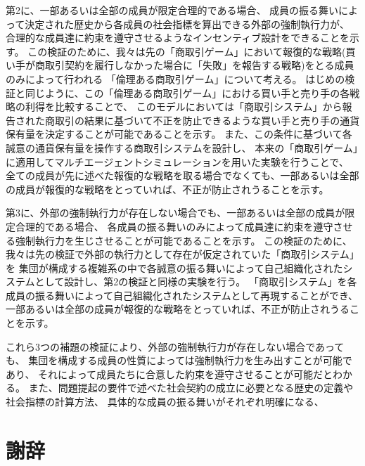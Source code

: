 \documentclass[a4j]{ujreport}
\begin{document}
第2に、一部あるいは全部の成員が限定合理的である場合、
成員の振る舞いによって決定された歴史から各成員の社会指標を算出できる外部の強制執行力が、
合理的な成員達に約束を遵守させるようなインセンティブ設計をできることを示す。
この検証のために、我々は先の「商取引ゲーム」において報復的な戦略(買い手が商取引契約を履行しなかった場合に「失敗」を報告する戦略)をとる成員のみによって行われる
「倫理ある商取引ゲーム」について考える。
はじめの検証と同じように、この「倫理ある商取引ゲーム」における買い手と売り手の各戦略の利得を比較することで、
このモデルにおいては「商取引システム」から報告された商取引の結果に基づいて不正を防止できるような買い手と売り手の通貨保有量を決定することが可能であることを示す。
また、この条件に基づいて各誠意の通貨保有量を操作する商取引システムを設計し、
本来の「商取引ゲーム」に適用してマルチエージェントシミュレーションを用いた実験を行うことで、
全ての成員が先に述べた報復的な戦略を取る場合でなくても、一部あるいは全部の成員が報復的な戦略をとっていれば、不正が防止されうることを示す。

第3に、外部の強制執行力が存在しない場合でも、一部あるいは全部の成員が限定合理的である場合、
各成員の振る舞いのみによって成員達に約束を遵守させる強制執行力を生じさせることが可能であることを示す。
この検証のために、我々は先の検証で外部の執行力として存在が仮定されていた「商取引システム」を
集団が構成する複雑系の中で各誠意の振る舞いによって自己組織化されたシステムとして設計し、第2の検証と同様の実験を行う。
「商取引システム」を各成員の振る舞いによって自己組織化されたシステムとして再現することができ、
一部あるいは全部の成員が報復的な戦略をとっていれば、不正が防止されうることを示す。

これら3つの補題の検証により、外部の強制執行力が存在しない場合であっても、
集団を構成する成員の性質によっては強制執行力を生み出すことが可能であり、
それによって成員たちに合意した約束を遵守させることが可能だとわかる。
また、問題提起の要件で述べた社会契約の成立に必要となる歴史の定義や社会指標の計算方法、
具体的な成員の振る舞いがそれぞれ明確になる、





\chapter*{謝辞}



\end{document}
